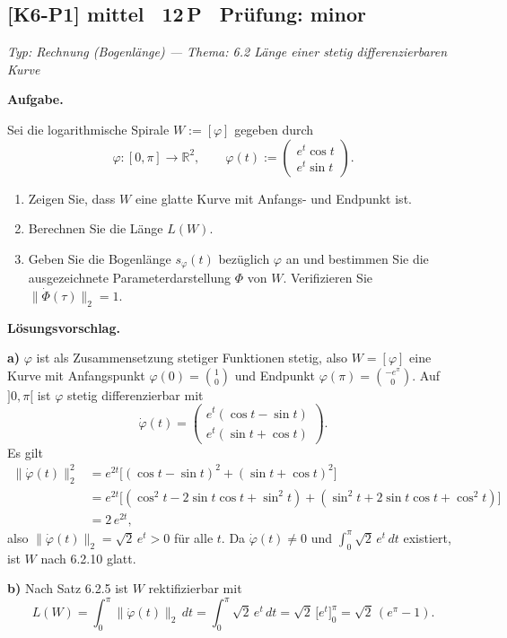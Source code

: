 \documentclass[a4paper,11pt]{article}
\begin{document}
\subsection*{[K6-P1] \normalfont mittel \textbullet\ 12\,P \textbullet\ Pr\"ufung: minor}
\textit{Typ: Rechnung (Bogenlänge)  ---  Thema: 6.2 Länge einer stetig differenzierbaren Kurve}\par\smallskip
\textbf{Aufgabe.}\par
Sei die logarithmische Spirale $W:=[\varphi]$ gegeben durch
\[\varphi:[0,\pi]\longrightarrow\mathbb{R}^2,\qquad \varphi(t):=\begin{pmatrix} e^{t}\cos t\\ e^{t}\sin t\end{pmatrix}.\]
\begin{enumerate}[label=\alph*)]
\item Zeigen Sie, dass $W$ eine glatte Kurve mit Anfangs- und Endpunkt ist.
\item Berechnen Sie die Länge $L(W)$.
\item Geben Sie die Bogenlänge $s_\varphi(t)$ bezüglich $\varphi$ an und bestimmen Sie die ausgezeichnete Parameterdarstellung $\Phi$ von $W$. Verifizieren Sie $\lVert\dot\Phi(\tau)\rVert_2=1$.
\end{enumerate}\par\smallskip
\textbf{L\"osungsvorschlag.}\par
\textbf{a)} $\varphi$ ist als Zusammensetzung stetiger Funktionen stetig, also $W=[\varphi]$ eine Kurve mit Anfangspunkt $\varphi(0)=\binom{1}{0}$ und Endpunkt $\varphi(\pi)=\binom{-e^{\pi}}{0}$. Auf $]0,\pi[$ ist $\varphi$ stetig differenzierbar mit
\[\dot\varphi(t)=\begin{pmatrix} e^{t}(\cos t-\sin t)\\ e^{t}(\sin t+\cos t)\end{pmatrix}.\]
Es gilt
\begin{align*}\lVert\dot\varphi(t)\rVert_2^2 &= e^{2t}\big[(\cos t-\sin t)^2+(\sin t+\cos t)^2\big]\\ &= e^{2t}\big[(\cos^2 t-2\sin t\cos t+\sin^2 t)+(\sin^2 t+2\sin t\cos t+\cos^2 t)\big]\\ &= 2\,e^{2t},\end{align*}
also $\lVert\dot\varphi(t)\rVert_2=\sqrt{2}\,e^{t}>0$ für alle $t$. Da $\dot\varphi(t)\neq 0$ und $\int_0^\pi\sqrt2\,e^t\,dt$ existiert, ist $W$ nach 6.2.10 glatt.

\textbf{b)} Nach Satz 6.2.5 ist $W$ rektifizierbar mit
\[L(W)=\int_0^{\pi}\lVert\dot\varphi(t)\rVert_2\,dt=\int_0^{\pi}\sqrt2\,e^{t}\,dt=\sqrt2\,\big[e^{t}\big]_0^{\pi}=\sqrt2\,(e^{\pi}-1).\]
\end{document}
